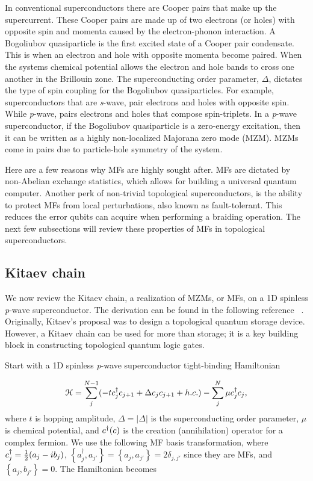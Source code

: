 In conventional superconductors there are Cooper pairs that make up the supercurrent.
These Cooper pairs are made up of two electrons (or holes) with opposite spin and momenta caused by the electron-phonon interaction.
A Bogoliubov quasiparticle is the first excited state of a Cooper pair condensate.
This is when an electron and hole with opposite momenta become paired.
When the systems chemical potential allows the electron and hole bands to cross one another in the Brillouin zone.
The superconducting order parameter, $\Delta$, dictates the type of spin coupling for the Bogoliubov quasiparticles.
For example, superconductors that are \textit{s}-wave, pair electrons and holes with opposite spin.
While \textit{p}-wave, pairs electrons and holes that compose spin-triplets.
In a \textit{p}-wave superconductor, if the Bogoliubov quasiparticle is a zero-energy excitation, then it can be written as a highly non-localized Majorana zero mode (MZM).
MZMs come in pairs due to particle-hole symmetry of the system.

Here are a few reasons why MFs are highly sought after.
MFs are dictated by non-Abelian exchange statistics, which allows for building a universal quantum computer.
Another perk of non-trivial topological superconductors, is the ability to protect MFs from local perturbations, also known as fault-tolerant.
This reduces the error qubits can acquire when performing a braiding operation.
The next few subsections will review these properties of MFs in topological superconductors.

\subsection{Kitaev chain}
We now review the Kitaev chain, a realization of MZMs, or MFs, on a 1D spinless \textit{p}-wave superconductor.
The derivation can be found in the following reference ~\cite{kitaevUnpairedMajoranaFermions2001}.
Originally, Kitaev's proposal was to design a topological quantum storage device.
However, a Kitaev chain can be used for more than storage; it is a key building block in constructing topological quantum logic gates.

Start with a 1D spinless \textit{p}-wave superconductor tight-binding Hamiltonian

\begin{equation}
  \mathcal{H} = \sum_j^{N-1} (-t c^{\dagger}_j c_{j+1} + \Delta c_j c_{j+1} + h.c.) - \sum_j^{N} \mu c^{\dagger}_j c_j,
\end{equation}
where $t$ is hopping amplitude, $\Delta = |\Delta|$ is the superconducting order parameter, $\mu$ is chemical potential, and $c^{\dagger} (c)$ is the creation (annihilation) operator for a complex fermion.
We use the following MF basis transformation, where
$c^{\dagger}_j = \tfrac{1}{2} (a_j - i b_j)$, $\left\{ a^{\dagger}_j, a_{j'} \right\} = \left\{ a_j, a_{j'} \right\} = 2\delta_{j,j'}$
since they are MFs, and $\left\{a_j,b_{j'}\right\} = 0$.
The Hamiltonian becomes

